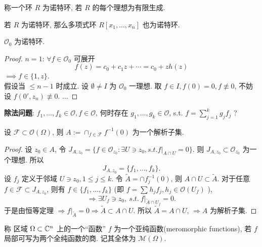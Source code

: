 \begin{definition}
  称一个环 $R$ 为{\sffamily\small 诺特环}, 若 $R$ 的每个理想为有限生成.  
\end{definition}

\begin{theorem}[Hilbert 定理]
  若 $R$ 为诺特环, 那么多项式环 $R[x_1,\dots,x_n] $ 也为诺特环.  
\end{theorem}

\begin{theorem}
  $\mathcal{O}_0$ 为诺特环. 
\end{theorem}
\begin{proof}
  $n=1$: $\forall f \in \mathcal{O}_0$ 可展开 
  $$ f(z)=c_0+c_1 z+ \cdots =c_0+z h(z) $$  
  $\implies f \in \{1,z\}$.\\
  假设当 $\leq n-1$ 时成立. 设 $\emptyset \neq I$ 为 $\mathcal{O}_0$  一理想. 取 $f \in I, f(0)=0, f \not \equiv 0$, 不妨设 $f(0',z_n) \not \equiv 0$.   ... 
\end{proof}

\noindent\textbf{除法问题}:
$f_1,\dots,f_k \in \mathcal{O}, f \in \mathcal{O}$, 何时存在 $g_1,\dots,g_k \in \mathcal{O}$, s.t. $f=\sum_{j=1}^{k}g_j f_j$ ?  

\begin{corollary}
  设 $\mathcal{F} \subset \mathcal{O}(\Omega )$, 则 $A:=\cap _{f \in \mathcal{F}}f^{-1}(0)$ 为一个解析子集.  
\end{corollary}
\begin{proof}
  设 $z_0 \in A$, 
  令 $J_{A,z_{0}}=\{f \in \mathcal{O}_{z_0}: \exists U \ni z_0, s.t. f|_{A \cap U}=0 \}$. 则 
  $J_{A,z_{0}} \subset \mathcal{O}_{z_0}$ 为一个理想. 所以 
  $$ J_{A,z_{0}}=\{f_1,\dots,f_k\} .$$ 
  设 $f_j$ 定义于邻域 $U \ni z_0, 1 \leq  j \leq k$. 令 $\tilde{A}=\cap f^{-1}_j(0)$, 
  则 $A \cap U \subset \tilde{A}$. 
  对于任意 $f \in \mathcal{F} \subset J_{A,z_{0}}$, 则有 $f \in \{f_1,\dots,f_k\}$ (即 $f=\sum_{}^{}h_j f_j, h_j \in \mathcal{O}(U_f)$ ),
  $$ \Rightarrow \exists  U_f \ni z_0, ~ s.t. ~ f|_{\tilde{A} \cap U_f} =0.$$  
  于是由恒等定理 $\Rightarrow f|_{\tilde{A}}=0 \Rightarrow \tilde{A} \subset A \cap U$. 所以 $\tilde{A} = A \cap U$, $\Rightarrow A$ 为解析子集.       
\end{proof}

\begin{definition}
  称 区域 $\Omega \subset {\mathbb C}^n $ 上的一个``函数''  $f$ 为一个亚纯函数(meromorphic functions), 若 $f$ 局部可写为两个全纯函数的商. 记其全体为 $\mathcal{M} (\Omega )$.   
\end{definition}

